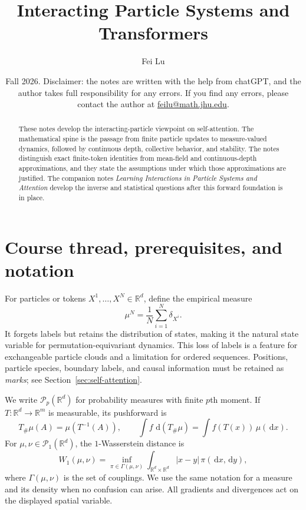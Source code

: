 \documentclass[11pt]{amsart}
\title{Interacting Particle Systems and Transformers}
\author{Fei Lu}
\date{Fall 2026. Disclaimer: the notes are written with the help from chatGPT, and the author takes full responsibility for any errors. If you find any errors, please contact the author at \href{mailto:feilu@math.jhu.edu}{feilu@math.jhu.edu}.}
\numberwithin{equation}{section}
\theoremstyle{plain}
\newcommand{\R}{\mathbb{R}}
\newcommand{\cP}{\mathcal{P}}
\newcommand{\dd}{\,\mathrm{d}}
\newcommand{\abs}[1]{\left\lvert#1\right\rvert}
\begin{document}
\begin{abstract}
These notes develop the interacting-particle viewpoint on self-attention.
The mathematical spine is the passage from finite particle updates to
measure-valued dynamics, followed by continuous depth, collective behavior,
and stability.  The notes
distinguish exact finite-token identities from mean-field and continuous-depth
approximations, and they state the assumptions under which those approximations
are justified.  The companion notes \emph{Learning Interactions in Particle
Systems and Attention} develop the inverse and statistical questions after
this forward foundation is in place.
\end{abstract}

\maketitle
\tableofcontents

\section*{Course thread, prerequisites, and notation}
For particles or tokens $X^1,\ldots,X^N\in\R^d$, define the empirical measure
\begin{equation}\label{eq:empirical-measure}
    \mu^N=\frac1N\sum_{i=1}^N\delta_{X^i}.
\end{equation}
It forgets labels but retains the distribution of states, making it the natural
state variable for permutation-equivariant dynamics.  This loss of labels is a
feature for exchangeable particle clouds and a limitation for ordered
sequences.  Positions, particle species, boundary labels, and causal
information must be retained as \emph{marks}; see
Section~\ref{sec:self-attention}.

We write $\cP_p(\R^d)$ for probability measures with finite $p$th moment.  If
$T:\R^d\to\R^m$ is measurable, its pushforward is
\[
    T_\#\mu(A)=\mu(T^{-1}(A)),\qquad
    \int f\,\dd(T_\#\mu)=\int f(T(x))\,\mu(\dd x).
\]
For $\mu,\nu\in\cP_1(\R^d)$, the $1$-Wasserstein distance is
\begin{equation}\label{eq:w1-definition}
    W_1(\mu,\nu)
    =\inf_{\pi\in\Gamma(\mu,\nu)}
      \int_{\R^d\times\R^d}\abs{x-y}\,\pi(\dd x,\dd y),
\end{equation}
where $\Gamma(\mu,\nu)$ is the set of couplings.  We use the same notation for a
measure and its density when no confusion can arise.  All gradients and
divergences act on the displayed spatial variable.
\end{document}
